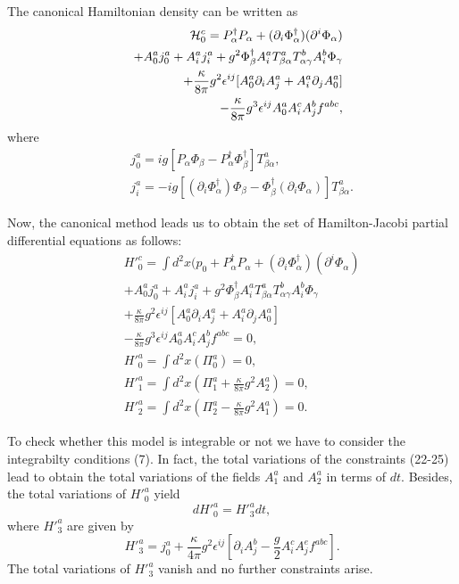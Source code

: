 \documentclass[a4paper,12pt]{article}
\begin{document}
The canonical Hamiltonian density can be written as
\begin{eqnarray}
&&{\cal H}_{0}^{c} = P_{\alpha}^{\dag}P_{\alpha}+
(\partial_{i}\Phi_{\alpha}^{\dag})(\partial^{i}\Phi_{\alpha})\nonumber\\&&+
A_{0}^{a}j_{0}^{a} +A_{i}^{a}j_{i}^{a} +
g^{2}\Phi_{\beta}^{\dag}A_{i}^{a}T_{\beta\alpha}^{a}T_{\alpha\gamma}^{b}A_{i}^{b}\Phi_{\gamma}\nonumber\\&&
+\frac{\kappa}{8\pi}g^{2}\epsilon^{ij}[A_{0}^{a}\partial_{i}A_{j}^{a}
+ A_{i}^{a}\partial_{j}A_{0}^{a}]\nonumber\\&& -
\frac{\kappa}{8\pi}g^{3}\epsilon^{ij}
A_{0}^{a}A_{i}^{c}A_{j}^{b}f^{abc},
\end{eqnarray}
where
\begin{eqnarray}
&&j_{0}^{a}= i g[P_{\alpha} \Phi_{\beta}-
P_{\alpha}^{\dag}\Phi_{\beta}^{\dag}]T_{\beta\alpha}^{a},\\
&&j_{i}^{a}= -i g[(\partial_{i} \Phi_{\alpha}^{\dag})\Phi_{\beta}
-
\Phi_{\beta}^{\dag}(\partial_{i}\Phi_{\alpha})]T_{\beta\alpha}^{a}.
\end{eqnarray}

Now, the canonical method leads us to obtain the set of
Hamilton-Jacobi partial differential equations as follows:
\begin{eqnarray}
&&{H'}_{0}^{c}= \int d^{2}x(p_{0} + P_{\alpha}^{\dag}P_{\alpha}+
(\partial_{i}\Phi_{\alpha}^{\dag})(\partial^{i}\Phi_{\alpha})\nonumber\\&&+
A_{0}^{a}j_{0}^{a} +A_{i}^{a}j_{i}^{a} +
g^{2}\Phi_{\beta}^{\dag}A_{i}^{a}T_{\beta\alpha}^{a}T_{\alpha\gamma}^{b}A_{i}^{b}\Phi_{\gamma}\nonumber\\&&
+\frac{\kappa}{8\pi}g^{2}\epsilon^{ij}[A_{0}^{a}\partial_{i}A_{j}^{a}
+ A_{i}^{a}\partial_{j}A_{0}^{a}]\nonumber\\&& -
\frac{\kappa}{8\pi}g^{3}\epsilon^{ij}
A_{0}^{a}A_{i}^{c}A_{j}^{b}f^{abc} =0,\\
&&{H'}_{0}^{a}= \int d^{2}x(\Pi_{0}^{a}) =0,\\
&&{H'}_{1}^{a}= \int d^{2}x\left(\Pi_{1}^{a} +
\frac{\kappa}{8\pi}g^{2}A_{2}^{a}\right)=0,\\
&&{H'}_{2}^{a}=\int d^{2}x\left( \Pi_{2}^{a} -
\frac{\kappa}{8\pi}g^{2}A_{1}^{a}\right)=0.
\end{eqnarray}

To check whether this model is integrable or not we have to
consider the integrabilty conditions (7). In fact, the total
variations of the constraints (22-25) lead to obtain the total
variations of the fields $A_{1}^{a}$ and $A_{2}^{a}$ in terms of
$dt$. Besides, the total variations of ${H'}_{0}^{a}$ yield
\begin{equation}
d{H'}_{0}^{a}={H'}_{3}^{a}dt,
\end{equation}
where ${H'}_{3}^{a}$ are given by
\begin{equation}
{H'}_{3}^{a}=j_{0}^{a} +
\frac{\kappa}{4\pi}g^{2}\epsilon^{ij}[\partial_{i}A_{j}^{b}
-\frac{g}{2}A_{i}^{c}A_{j}^{e}f^{abc}].
\end{equation}
The total variations of ${H'}_{3}^{a}$ vanish and no further
constraints arise.
\end{document}
